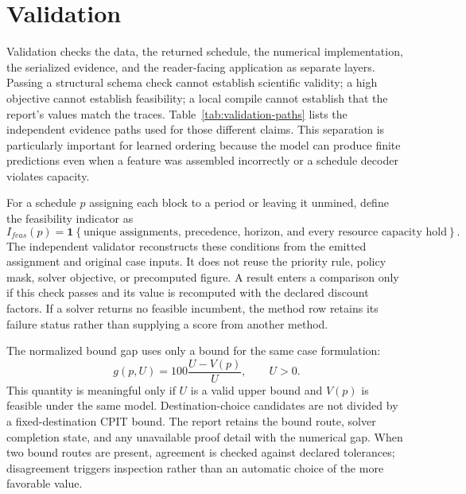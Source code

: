 \section{Validation}
\label{sec:validation}
Validation checks the data, the returned schedule, the numerical implementation, the serialized evidence, and the reader-facing application as separate layers. Passing a structural schema check cannot establish scientific validity; a high objective cannot establish feasibility; a local compile cannot establish that the report's values match the traces. Table~\ref{tab:validation-paths} lists the independent evidence paths used for those different claims. This separation is particularly important for learned ordering because the model can produce finite predictions even when a feature was assembled incorrectly or a schedule decoder violates capacity.

For a schedule $p$ assigning each block to a period or leaving it unmined, define the feasibility indicator as
\begin{equation}
 I_{feas}(p)=\mathbf 1\left\{\text{unique assignments, precedence, horizon, and every resource capacity hold}\right\}.
\end{equation}
The independent validator reconstructs these conditions from the emitted assignment and original case inputs. It does not reuse the priority rule, policy mask, solver objective, or precomputed figure. A result enters a comparison only if this check passes and its value is recomputed with the declared discount factors. If a solver returns no feasible incumbent, the method row retains its failure status rather than supplying a score from another method.

The normalized bound gap uses only a bound for the same case formulation:
\begin{equation}
 g(p,U)=100\frac{U-V(p)}{U},\qquad U>0.
\end{equation}
This quantity is meaningful only if $U$ is a valid upper bound and $V(p)$ is feasible under the same model. Destination-choice candidates are not divided by a fixed-destination CPIT bound. The report retains the bound route, solver completion state, and any unavailable proof detail with the numerical gap. When two bound routes are present, agreement is checked against declared tolerances; disagreement triggers inspection rather than an automatic choice of the more favorable value.

